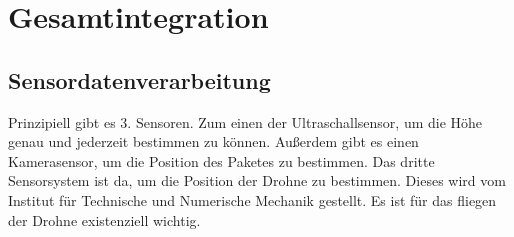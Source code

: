 \chapter{Gesamtintegration}
\label{gesamtintegration}

\section{Sensordatenverarbeitung}
Prinzipiell gibt es 3. Sensoren. Zum einen der Ultraschallsensor, um die Höhe genau und jederzeit bestimmen zu können. Außerdem gibt es einen Kamerasensor, um die Position des Paketes zu bestimmen. Das dritte Sensorsystem ist da, um die Position der Drohne zu bestimmen. Dieses wird vom Institut für Technische und Numerische Mechanik gestellt. Es ist für das fliegen der Drohne existenziell wichtig.

